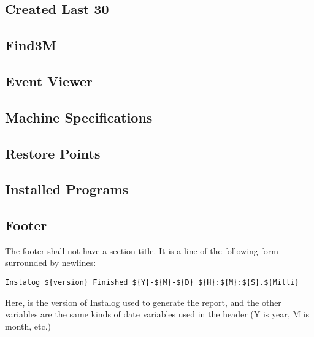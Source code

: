 \subsection{Created Last 30}
\subsection{Find3M}
\subsection{Event Viewer}
\subsection{Machine Specifications}
\subsection{Restore Points}
\subsection{Installed Programs}
\subsection{Footer}
The footer shall not have a section title. It is a line of the following form
surrounded by newlines:
\begin{verbatim}
Instalog ${version} Finished ${Y}-${M}-${D} ${H}:${M}:${S}.${Milli}
\end{verbatim}

Here,  is the version of Instalog used to generate the report, and
the other variables are the same kinds of date variables used in the header (Y
is year, M is month, etc.)

